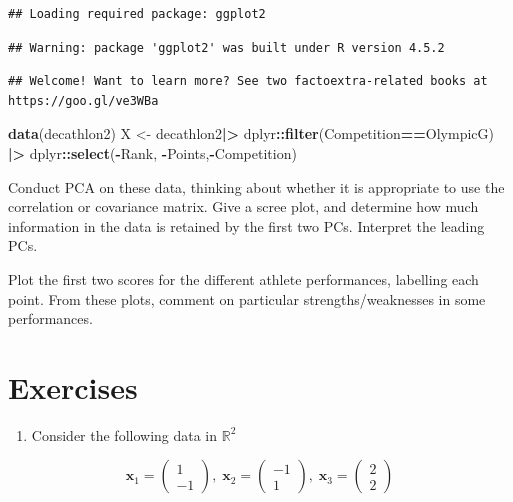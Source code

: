 \documentclass[
]{book}
\newenvironment{Shaded}{\begin{snugshade}}{\end{snugshade}}
\newcommand{\FunctionTok}[1]{\textcolor[rgb]{0.13,0.29,0.53}{\textbf{#1}}}
\newcommand{\NormalTok}[1]{#1}
\newcommand{\OtherTok}[1]{\textcolor[rgb]{0.56,0.35,0.01}{#1}}
\newcommand{\SpecialCharTok}[1]{\textcolor[rgb]{0.81,0.36,0.00}{\textbf{#1}}}
\newcommand{\StringTok}[1]{\textcolor[rgb]{0.31,0.60,0.02}{#1}}
\providecommand{\tightlist}{%
  \setlength{\itemsep}{0pt}\setlength{\parskip}{0pt}}
\theoremstyle{definition}
\theoremstyle{definition}
\theoremstyle{definition}
\theoremstyle{definition}
\theoremstyle{remark}
\begin{document}
\begin{verbatim}
## Loading required package: ggplot2
\end{verbatim}

\begin{verbatim}
## Warning: package 'ggplot2' was built under R version 4.5.2
\end{verbatim}

\begin{verbatim}
## Welcome! Want to learn more? See two factoextra-related books at https://goo.gl/ve3WBa
\end{verbatim}

\begin{Shaded}
\begin{Highlighting}[]
\FunctionTok{data}\NormalTok{(decathlon2)}
\NormalTok{X }\OtherTok{\textless{}{-}}\NormalTok{ decathlon2}\SpecialCharTok{|\textgreater{}}\NormalTok{ dplyr}\SpecialCharTok{::}\FunctionTok{filter}\NormalTok{(Competition}\SpecialCharTok{==}\StringTok{\textquotesingle{}OlympicG\textquotesingle{}}\NormalTok{) }\SpecialCharTok{|\textgreater{}}\NormalTok{ dplyr}\SpecialCharTok{::}\FunctionTok{select}\NormalTok{(}\SpecialCharTok{{-}}\NormalTok{Rank, }\SpecialCharTok{{-}}\NormalTok{Points,}\SpecialCharTok{{-}}\NormalTok{Competition)}
\end{Highlighting}
\end{Shaded}

Conduct PCA on these data, thinking about whether it is appropriate to use the correlation or covariance matrix. Give a scree plot, and determine how much information in the data is retained by the first two PCs.
Interpret the leading PCs.

Plot the first two scores for the different athlete performances, labelling each point. From these plots, comment on particular strengths/weaknesses in some performances.

\section{Exercises}\label{exercises-1}

\begin{enumerate}
\def\labelenumi{\arabic{enumi}.}
\tightlist
\item
  Consider the following data in \(\mathbb{R}^2\)
\end{enumerate}

\[\mathbf x_1 =\begin{pmatrix}1\\-1\end{pmatrix},\; \mathbf x_2 =\begin{pmatrix}-1\\1\end{pmatrix},
\;\mathbf x_3 =\begin{pmatrix}2\\2\end{pmatrix}\]
\end{document}
